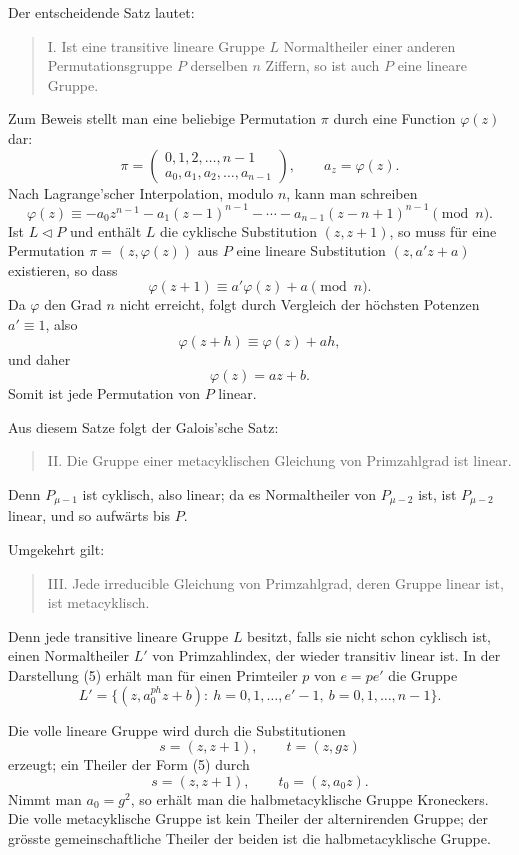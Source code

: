 \documentclass[11pt]{article}
\newcommand{\perm}[2]{\begin{pmatrix}#1\\#2\end{pmatrix}}
\begin{document}
Der entscheidende Satz lautet:
\begin{quote}
I. Ist eine transitive lineare Gruppe $L$ Normaltheiler einer anderen Permutationsgruppe $P$ derselben $n$ Ziffern, so ist auch $P$ eine lineare Gruppe.
\end{quote}

Zum Beweis stellt man eine beliebige Permutation $\pi$ durch eine Function $\varphi(z)$ dar:
\[
 \pi=\perm{0,1,2,\ldots,n-1}{a_0,a_1,a_2,\ldots,a_{n-1}},
 \qquad a_z=\varphi(z).
\]
Nach Lagrange'scher Interpolation, modulo $n$, kann man schreiben
\[
  \varphi(z)\equiv -a_0 z^{n-1}-a_1(z-1)^{n-1}-\cdots-a_{n-1}(z-n+1)^{n-1}\pmod n. \tag{6}
\]
Ist $L\triangleleft P$ und enthält $L$ die cyklische Substitution $(z,z+1)$, so muss für eine Permutation $\pi=(z,\varphi(z))$ aus $P$ eine lineare Substitution $(z,a'z+a)$ existieren, so dass
\[
  \varphi(z+1)\equiv a'\varphi(z)+a\pmod n.                     \tag{7}
\]
Da $\varphi$ den Grad $n$ nicht erreicht, folgt durch Vergleich der höchsten Potenzen $a'\equiv1$, also
\[
  \varphi(z+h)\equiv \varphi(z)+ah,
\]
und daher
\[
  \varphi(z)=az+b.                                               \tag{8}
\]
Somit ist jede Permutation von $P$ linear.

Aus diesem Satze folgt der Galois'sche Satz:
\begin{quote}
II. Die Gruppe einer metacyklischen Gleichung von Primzahlgrad ist linear.
\end{quote}
Denn $P_{\mu-1}$ ist cyklisch, also linear; da es Normaltheiler von $P_{\mu-2}$ ist, ist $P_{\mu-2}$ linear, und so aufwärts bis $P$.

Umgekehrt gilt:
\begin{quote}
III. Jede irreducible Gleichung von Primzahlgrad, deren Gruppe linear ist, ist metacyklisch.
\end{quote}
Denn jede transitive lineare Gruppe $L$ besitzt, falls sie nicht schon cyklisch ist, einen Normaltheiler $L'$ von Primzahlindex, der wieder transitiv linear ist. In der Darstellung (5) erhält man für einen Primteiler $p$ von $e=pe'$ die Gruppe
\[
  L'=\bigl\{(z,a_0^{ph}z+b):\ h=0,1,\ldots,e'-1,
       \ b=0,1,\ldots,n-1\bigr\}.
\]

Die volle lineare Gruppe wird durch die Substitutionen
\[
  s=(z,z+1),\qquad t=(z,gz)                                      \tag{9}
\]
erzeugt; ein Theiler der Form (5) durch
\[
  s=(z,z+1),\qquad t_0=(z,a_0z).                                \tag{10}
\]
Nimmt man $a_0=g^2$, so erhält man die halbmetacyklische Gruppe Kroneckers. Die volle metacyklische Gruppe ist kein Theiler der alternirenden Gruppe; der grösste gemeinschaftliche Theiler der beiden ist die halbmetacyklische Gruppe.
\end{document}
